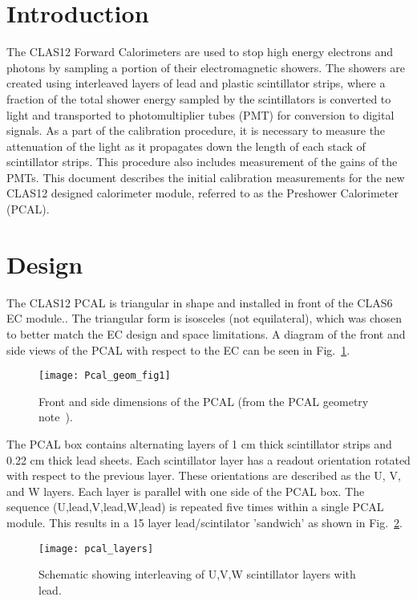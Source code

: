 \FloatBarrier

\section{Introduction}
The CLAS12 Forward Calorimeters are used to stop high energy electrons and photons by sampling a portion of their electromagnetic showers.  The showers are created using interleaved layers of lead and plastic scintillator strips, where a fraction of the total shower energy sampled by the scintillators is converted to light and transported to photomultiplier tubes (PMT) for conversion to digital signals.  As a part of the calibration procedure, it is necessary to measure the attenuation of the light as it propagates down the length of each stack of scintillator strips.  This procedure also includes measurement of the gains of the PMTs.  This document describes the initial calibration measurements for the new CLAS12 designed calorimeter module, referred to as the Preshower Calorimeter (PCAL).

\section{Design}
The CLAS12 PCAL is triangular in shape and installed in front of the CLAS6 EC module.. The triangular form is isosceles (not equilateral), which was chosen
to better match the EC design and space limitations. A diagram of the front and side views of the PCAL with respect to the EC can be seen in 
Fig.~\ref{fig:geomfig1}. 

\begin{figure}[h]
    \centering
    \texttt{[image: Pcal\_geom\_fig1]}
    \caption{Front and side dimensions of the PCAL (from the PCAL geometry note~\cite{bib:geomnote}).}
    \label{fig:geomfig1}
\end{figure}

The PCAL box contains alternating layers of 1 cm thick scintillator strips and 0.22 cm thick lead sheets. Each scintillator layer has a readout orientation rotated with respect to the previous layer. These orientations are described as the U, V, and W layers. Each layer is parallel with one side of the PCAL box. The sequence (U,lead,V,lead,W,lead) is repeated five times within a single PCAL module. This results in a 15 layer lead/scintilator 'sandwich' as shown in Fig.~\ref{fig:geomfig4}.

\begin{figure}[h]
    \centering
    \texttt{[image: pcal\_layers]}
    \caption{Schematic showing interleaving of U,V,W scintillator layers with lead.}
    \label{fig:geomfig4}
\end{figure}


